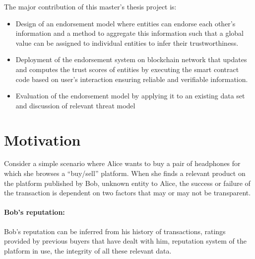 The major contribution of this master's thesis project is:
\begin{itemize}
	\item Design of an endorsement model where entities can endorse each
		other's information and a method to aggregate this information such
		that a global value can be assigned to individual entities to infer
		their trustworthiness. 
	\item Deployment of the endorsement system on blockchain network that
		updates and computes the trust scores of entities by executing the
		smart contract code based on user's interaction ensuring reliable and
		verifiable information. 
	\item Evaluation of the endorsement model by applying it to an existing
		data set and discussion of relevant threat model
\end{itemize}


 
\section{Motivation}
Consider a simple scenario where Alice wants to buy a pair of headphones for
which she browses a ``buy/sell'' platform. When she finds a relevant product on the
platform published by Bob, unknown entity to Alice, the success or failure of
the transaction is dependent on two factors that may or may not be transparent.
\paragraph{Bob's reputation:}Bob's reputation can be inferred from his history
of transactions, ratings provided by previous buyers that have dealt with him,
reputation system of the platform in use, the integrity of all these relevant
data.  
